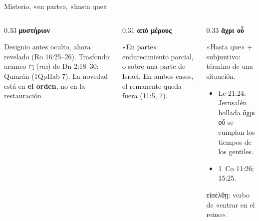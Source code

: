 \documentclass[hyperref={bookmarks=false},aspectratio=169]{beamer}
\newcommand{\heb}[1]{\mbox{\foreignlanguage{hebrew}{#1}}}
\newcommand{\grc}[1]{\foreignlanguage{ancientgreek}{#1}}
\newcommand{\destacar}[1]{\textbf{\textcolor{ladrillo}{#1}}}
\newcommand{\notafig}[1]{\par\vspace{2pt}{\fontsize{5}{6}\selectfont\color{sepia}\hfill\textit{Nota.} #1\par}}
\newcommand{\elabpropia}{\notafig{Elaboración propia.}}
\begin{document}
\begin{frame}{Misterio, «en parte», «hasta que»}
\begin{columns}[T,onlytextwidth]
\begin{column}{0.33\textwidth}\small\RaggedRight
\textbf{\textcolor{ladrillo}{\grc{μυστήριον}}}\par\smallskip
Designio antes oculto, ahora revelado (Ro 16:25--26). Trasfondo: arameo \heb{רָז} (\emph{raz}) de Dn 2:18--30; Qumrán (1QpHab 7). La novedad está en \destacar{el orden}, no en la restauración.
\end{column}
\begin{column}{0.31\textwidth}\small\RaggedRight
\textbf{\textcolor{ladrillo}{\grc{ἀπὸ μέρους}}}\par\smallskip
«En parte»: endurecimiento parcial, o sobre una parte de Israel. En ambos casos, el remanente queda fuera (11:5, 7).
\end{column}
\begin{column}{0.33\textwidth}\small\RaggedRight
\textbf{\textcolor{ladrillo}{\grc{ἄχρι οὗ}}}\par\smallskip
«Hasta que» + subjuntivo: término de una situación.
\begin{itemize}
\item Lc 21:24: Jerusalén hollada \grc{ἄχρι οὗ} se cumplan los tiempos de los gentiles.
\item 1~Co 11:26; 15:25.
\end{itemize}
\grc{εἰσέλθῃ}: verbo de «entrar en el reino».
\end{column}
\end{columns}\vspace{4pt}
\centering
{}\elabpropia
\end{frame}
\end{document}
